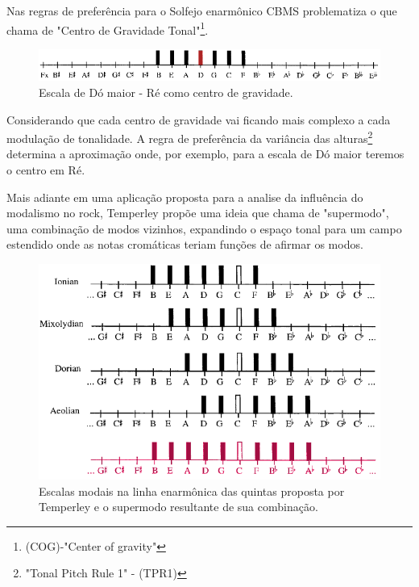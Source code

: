 \documentclass[
	12pt,				%
	openright,			%
	twoside,			%
	a4paper,			%
	english,			%
	french,				%
	spanish,			%
	brazil				%
	]{abntex2}
\begin{document}
\pagebreak
Nas regras de preferência para o Solfejo enarmônico  CBMS problematiza o que chama de "Centro de Gravidade Tonal"\footnote{(COG)-"Center of gravity"\cite[ p.125]{temperley2001cognition}}.

\begin{figure}[!h]
	\caption{\label{fig_grafico}Escala de Dó maior - Ré como centro de gravidade. }
	\begin{center}
	    \includegraphics[scale=0.6]{CBMS/COG_re_lineoffifths.png}
	\end{center}
\end{figure}

Considerando que cada centro de gravidade vai ficando mais complexo a cada modulação de tonalidade. A regra de preferência da variância das alturas\footnote{"Tonal Pitch Rule 1" - (TPR1)\cite[ p.125]{temperley2001cognition}} determina a aproximação onde, por exemplo, para a escala de Dó maior teremos o centro em Ré.

Mais adiante em uma aplicação proposta para a analise da influência do modalismo no rock, Temperley propõe uma ideia que chama de "supermodo", uma combinação de modos vizinhos, expandindo o espaço tonal para um campo estendido onde as notas cromáticas teriam funções de afirmar os modos.

\begin{figure}[!h]
	\caption{\label{fig_grafico}Escalas modais na linha enarmônica das quintas proposta por Temperley e o supermodo resultante de sua combinação. }
	\begin{center}
	    \includegraphics[scale=0.6]{CBMS/modosrockgregos_temperley.png}
	\end{center}
\end{figure}
\end{document}

